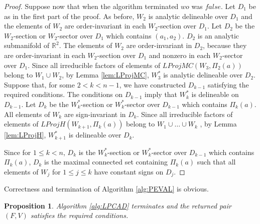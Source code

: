 \documentclass[english]{amsart}
\numberwithin{equation}{section}
\numberwithin{figure}{section}
\newtheorem{prop}[thm]{Proposition}
\begin{document}
\begin{proof}
Suppose now that when the algorithm terminated $wo$ was $false$.
Let $D_{1}$ be as in the first part of the proof. As before, $W_{2}$
is analytic delineable over $D_{1}$ and the elements of $W_{2}$
are order-invariant in each $W_{2}$-section over $D_{1}$. Let $D_{2}$
be the $W_{2}$-section or $W_{2}$-sector over $D_{1}$ which contains
$(a_{1},a_{2})$. $D_{2}$ is an analytic submanifold of $\mathbb{R}^{2}$.
The elements of $W_{2}$ are order-invariant in $D_{2}$, because
they are order-invariant in each $W_{2}$-section over $D_{1}$ and
nonzero in each $W_{2}$-sector over $D_{1}$. Since all irreducible
factors of elements of $LProjMC(W_{3},\Pi_{2}(a))$ belong to $W_{1}\cup W_{2}$,
by Lemma \ref{lem:LProjMC}, $W_{3}^{*}$ is analytic delineable over
$D_{2}$. Suppose that, for some $2<k<n-1$, we have constructed $D_{k-1}$
satisfying the required conditions. The conditions on $D_{k-1}$ imply
that $W_{k}^{*}$ is delineable on $D_{k-1}$. Let $D_{k}$ be the
$W_{k}^{*}$-section or $W_{k}^{*}$-sector over $D_{k-1}$ which
contains $\Pi_{k}(a)$. All elements of $W_{k}$ are sign-invariant
in $D_{k}$. Since all irreducible factors of elements of $LProjH(W_{k+1},\Pi_{k}(a))$
belong to $W_{1}\cup\ldots\cup W_{k}$ , by Lemma \ref{lem:LProjH},
$W_{k+1}^{*}$ is delineable over $D_{k}$.

Since for $1\leq k<n$, $D_{k}$ is the $W_{k}^{*}$-section or $W_{k}^{*}$-sector
over $D_{k-1}$ which contains $\Pi_{k}(a)$, $D_{k}$ is the maximal
connected set containing $\Pi_{k}(a)$ such that all elements of $W_{j}$
for $1\leq j\leq k$ have constant signs on $D_{j}$. 
\end{proof}
Correctness and termination of Algorithm \ref{alg:PEVAL} is obvious.
\begin{prop}
Algorithm \ref{alg:LPCAD} terminates and the returned pair $(F,V)$
satisfies the required conditions.\end{prop}
\end{document}
